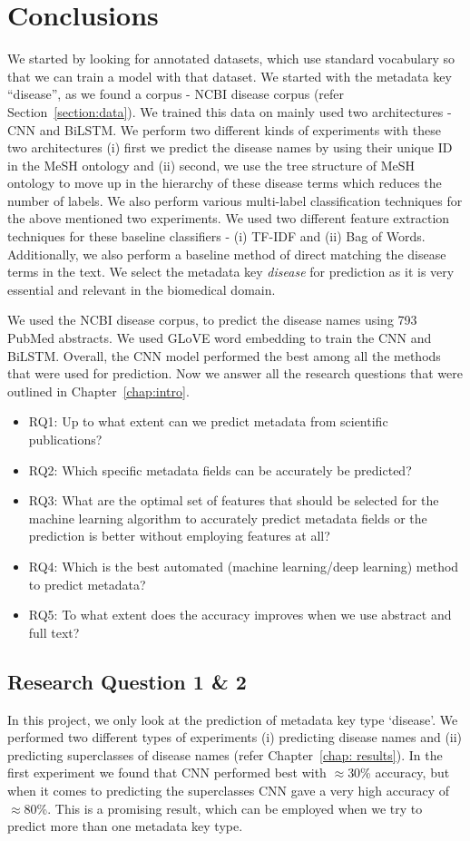 \section{Conclusions}\label{sec:conclusion}
We started by looking for annotated datasets, which use standard vocabulary so that we can train a model with that dataset. We started with the metadata key ``disease'', as we found a corpus - NCBI disease corpus (refer Section~\ref{section:data}). We trained this data on mainly used two architectures - CNN and BiLSTM. We perform two different kinds of experiments with these two architectures (i) first we predict the disease names by using their unique ID in the MeSH ontology and (ii) second, we use the tree structure of MeSH ontology to move up in the hierarchy of these disease terms which reduces the number of labels. We also perform various multi-label classification techniques for the above mentioned two experiments. We used two different feature extraction techniques for these baseline classifiers - (i) TF-IDF and (ii) Bag of Words. Additionally, we also perform a baseline method of direct matching the disease terms in the text. 
We select the metadata key \emph{disease} for prediction as it is very essential and relevant in the biomedical domain. 

We used the NCBI disease corpus, to predict the disease names using 793 PubMed abstracts. We used GLoVE word embedding to train the CNN and BiLSTM. 
Overall, the CNN model performed the best among all the methods that were used for prediction. Now we answer all the research questions that were outlined in Chapter~\ref{chap:intro}.
\begin{itemize}
    \item RQ1: Up to what extent can we predict metadata from scientific publications?
    \item RQ2: Which specific metadata fields can be accurately be predicted?
    \item RQ3: What are the optimal set of features that should be selected for the machine learning algorithm to accurately predict metadata fields or the prediction is better without employing features at all?
    \item RQ4: Which is the best automated (machine learning/deep learning) method to predict metadata?
    \item RQ5: To what extent does the accuracy improves when we use abstract and full text?
\end{itemize}

\subsection{Research Question 1 \& 2}
In this project, we only look at the prediction of metadata key type `disease'. We performed two different types of experiments (i) predicting disease names and (ii) predicting superclasses of disease names (refer Chapter~\ref{chap: results}). In the first experiment we found that CNN performed best with $\approx$30\% accuracy, but when it comes to predicting the superclasses CNN gave a very high accuracy of $\approx$80\%. This is a promising result, which can be employed when we try to predict more than one metadata key type. 

